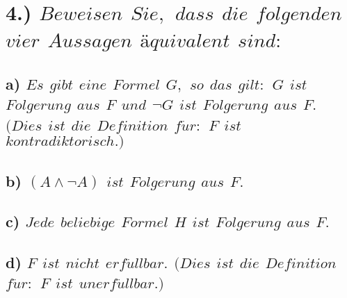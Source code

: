 \documentclass[titlepage]{article}
\newcommand{\1}{\mathbb{1}}
\newcommand{\0}{\mathbb{0}}
\begin{document}
	\section*{4.) \textit{$Beweisen$ $Sie,$ $dass$ $die$ $folgenden$ $vier$ $Aussagen$ $äquivalent$ $sind:$}}
		\subsection*{a) \textit{$Es$ $gibt$ $eine$ $Formel$ $G,$ $so$ $das$ $gilt:$ $G$ $ist$ $Folgerung$ $aus$ $F$ $und$ $\neg G$ $ist$ $Folgerung$ $aus$ $F.$ $(Dies$ $ist$ $die$ $Definition$ $f \ddot ur:$ $F$ $ist$ $kontradiktorisch.)$}}
		\subsection*{b) \textit{$(A\wedge\neg A)$ $ist$ $Folgerung$ $aus$ $F.$}}
		\subsection*{c) \textit{$Jede$ $beliebige$ $Formel$ $H$ $ist$ $Folgerung$ $aus$ $F.$}}
		\subsection*{d) \textit{$F$ $ist$ $nicht$ $erf\ddot ullbar.$ $(Dies$ $ist$ $die$ $Definition$ $f \ddot ur:$ $F$ $ist$ $unerf\ddot ullbar.)$}}
		
\end{document}

